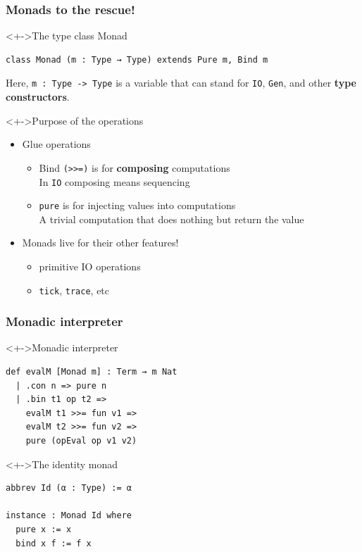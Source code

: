 \documentclass{beamer}
\begin{document}
\begin{frame}[fragile]
  \frametitle{Monads to the rescue!}
\begin{block}<+->{The type class Monad}
\begin{lstlisting}
class Monad (m : Type → Type) extends Pure m, Bind m
\end{lstlisting}
  Here, \lstinline{m : Type -> Type} is a variable that can stand for
  \texttt{IO}, \texttt{Gen}, and other \textbf{type constructors}. 
\end{block}
\begin{block}<+->{Purpose of the operations}
  \begin{itemize}
  \item Glue operations
    \begin{itemize}
    \item Bind \lstinline{(>>=)} is for \textbf{composing}
      computations\\
      In \lstinline{IO} composing means sequencing
    \item \lstinline{pure} is for injecting values into computations\\
      A trivial computation that does nothing but return the value
    \end{itemize}
  \item Monads live for their other features!
    \begin{itemize}
    \item primitive IO operations
    \item \lstinline{tick}, \lstinline{trace}, etc
    \end{itemize}
  \end{itemize}
\end{block}
\end{frame}     


\begin{frame}[fragile]
  \frametitle{Monadic interpreter}
\begin{exampleblock}<+->{Monadic interpreter}
\begin{lstlisting}
def evalM [Monad m] : Term → m Nat
  | .con n => pure n
  | .bin t1 op t2 =>
    evalM t1 >>= fun v1 =>
    evalM t2 >>= fun v2 =>
    pure (opEval op v1 v2)
\end{lstlisting}  
\end{exampleblock}
  \begin{alertblock}<+->{The identity monad}
\begin{lstlisting}
abbrev Id (α : Type) := α

instance : Monad Id where
  pure x := x
  bind x f := f x
\end{lstlisting}  
\end{alertblock}

\end{frame}             
\end{document}
